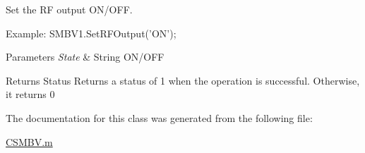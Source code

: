 Set the R\-F output O\-N/\-O\-F\-F. 

Example\-: S\-M\-B\-V1.\-Set\-R\-F\-Output('O\-N'); 
\begin{DoxyParams}{Parameters}
{\em State} & String O\-N/\-O\-F\-F \\
\hline
\end{DoxyParams}
\begin{DoxyReturn}{Returns}
Status Returns a status of 1 when the operation is successful. Otherwise, it returns 0 
\end{DoxyReturn}


The documentation for this class was generated from the following file\-:\begin{DoxyCompactItemize}
\item 
\hyperlink{_c_s_m_b_v_8m}{C\-S\-M\-B\-V.\-m}\end{DoxyCompactItemize}
